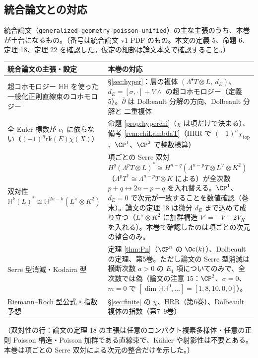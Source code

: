 \subsection{統合論文との対応}
統合論文（\texttt{generalized-geometry-poisson-unified}）の主な主張のうち、本巻が土台になるもの。（番号は統合論文 v1 PDF のもの。本文の定義 5、命題 6、定理 18、定理 22 を確認した。仮定の細部は論文本文で確認すること。）
\begin{center}
\begin{tabular}{p{}p{}}
\toprule
統合論文の主張・設定 & 本巻の対応 \\
\midrule
超コホモロジー $\mathbb{HH}$ を使った一般化正則直線束のコホモロジー & §\ref{sec:hyper}：層の複体 $(\Lambda^\bullet T\otimes L,\ d_E)$、$d_E=[\sigma,\cdot]+V\wedge$ の超コホモロジー（定義 5）。$\bar\partial$ は Dolbeault 分解の方向、Dolbeault 分解と \Cech{} 二重複体 \\
全 Euler 標数が $c_1$ に依らない（$(-1)^n\mathrm{rk}(E)\chi(X)$） & 命題 \ref{prop:hyperchi}（$\chi$ は項だけで決まる）、備考 \ref{rem:chiLambdaT}（HRR で $(-1)^n\chi_{\mathrm{top}}$、$\CP^1$、$\CP^2$ で整数検算） \\
双対性 $\mathbb H^k(L)^*\cong\mathbb H^{2n-k}(L^\vee\otimes K^2)$ & 項ごとの Serre 双対 $H^q(\Lambda^pT\otimes L)^*\cong H^{n-q}(\Lambda^{n-p}T\otimes L^\vee\otimes K^2)$（$\Lambda^pT^*\cong\Lambda^{n-p}T\otimes K$ による）が全次数 $p+q\leftrightarrow2n-p-q$ を入れ替える。$\CP^1$、$d_E=0$ で次元が一致することを数値確認（巻末）。論文の定理 18 は微分 $d_E$ まで込めて成り立つ（$L^\vee\otimes K^2$ に加群構造 $V'=-V+2V_K$ を入れる）。本巻で確認したのは項ごとの次元の整合のみ。 \\
Serre 型消滅・Kodaira 型 & 定理 \ref{thm:Pn}（$\CP^n$ の $\Oc(k)$）、Dolbeault の定理、第5巻。ただし論文の Serre 型消滅は横断次数 $a>0$ の $E_1$ 項についてのみで、全次数では偽（論文の注意 15：$\CP^2$、$\sigma=0$、$m=0$ で $[\dim\mathbb{HH}^0,\dots]=[1,8,10,0,0]$）。 \\
Riemann--Roch 型公式・指数予想 & §\ref{sec:finite} の $\chi$、HRR（第6巻）、Dolbeault 複体の指数（第7--9巻） \\
\bottomrule
\end{tabular}
\end{center}
（双対性の行：論文の定理 18 の主張は任意のコンパクト複素多様体・任意の正則 Poisson 構造・Poisson 加群である直線束で、Kähler や射影性は不要とある。本巻は項ごとの Serre 双対による次元の整合だけを示した。）

